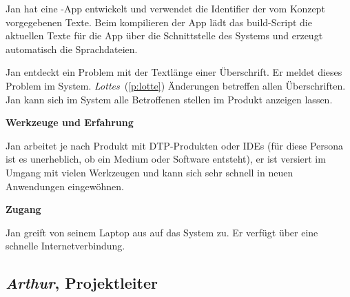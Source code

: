 \begin{multicols}{2}
Jan hat eine -App entwickelt und verwendet die Identifier der vom Konzept vorgegebenen Texte. Beim kompilieren der App lädt das build-Script die aktuellen Texte für die App über die Schnittstelle des Systems und erzeugt automatisch die Sprachdateien.

Jan entdeckt ein Problem mit der Textlänge einer Überschrift. Er meldet dieses Problem im System. \emph{Lottes}~(\ref{p:lotte}) Änderungen betreffen allen Überschriften. Jan kann sich im System alle Betroffenen stellen im Produkt anzeigen lassen.

\textbf{Werkzeuge und Erfahrung}

Jan arbeitet je nach Produkt mit DTP-Produkten oder IDEs (für diese Persona ist es unerheblich, ob ein Medium oder Software entsteht), er ist versiert im Umgang mit vielen Werkzeugen und kann sich sehr schnell in neuen Anwendungen eingewöhnen.

\textbf{Zugang}

Jan greift von seinem Laptop aus auf das System zu. Er verfügt über eine schnelle Internetverbindung.

\end{multicols}

\pagebreak

\subsection{\emph{Arthur}, Projektleiter}\label{p:arthur}

